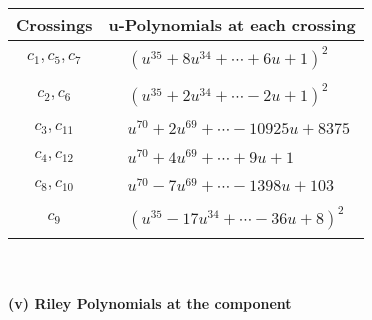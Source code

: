 \documentclass[1p]{elsarticle_modified}
\theoremstyle{definition}
\begin{document}
\begin{tabular}{m{50pt}|m{274pt}}
Crossings & \hspace{64pt}u-Polynomials at each crossing \\
\hline $$\begin{aligned}c_{1},c_{5},c_{7}\end{aligned}$$&$\begin{aligned}
&(u^{35}+8 u^{34}+\cdots+6 u+1)^{2}
\end{aligned}$\\
\hline $$\begin{aligned}c_{2},c_{6}\end{aligned}$$&$\begin{aligned}
&(u^{35}+2 u^{34}+\cdots-2 u+1)^{2}
\end{aligned}$\\
\hline $$\begin{aligned}c_{3},c_{11}\end{aligned}$$&$\begin{aligned}
&u^{70}+2 u^{69}+\cdots-10925 u+8375
\end{aligned}$\\
\hline $$\begin{aligned}c_{4},c_{12}\end{aligned}$$&$\begin{aligned}
&u^{70}+4 u^{69}+\cdots+9 u+1
\end{aligned}$\\
\hline $$\begin{aligned}c_{8},c_{10}\end{aligned}$$&$\begin{aligned}
&u^{70}-7 u^{69}+\cdots-1398 u+103
\end{aligned}$\\
\hline $$\begin{aligned}c_{9}\end{aligned}$$&$\begin{aligned}
&(u^{35}-17 u^{34}+\cdots-36 u+8)^{2}
\end{aligned}$\\
\hline
\end{tabular}\\~\\
\newpage\renewcommand{\arraystretch}{1}
\flushleft \textbf{(v) Riley Polynomials at the component}\newline \\
\end{document}
